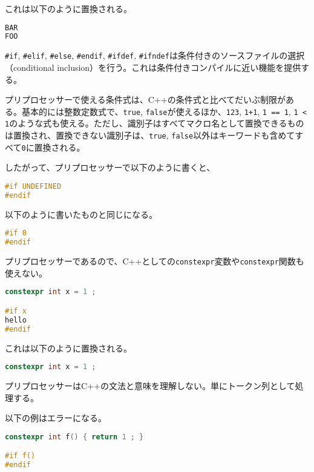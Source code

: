 これは以下のように置換される。

\begin{lstlisting}[language={C++}]
BAR
FOO
\end{lstlisting}


\texttt{\#if}, \texttt{\#elif}, \texttt{\#else}, \texttt{\#endif}, \texttt{\#ifdef}, \texttt{\#ifndef}は条件付きのソースファイルの選択（conditional inclusion）を行う。これは条件付きコンパイルに近い機能を提供する。


プリプロセッサーで使える条件式は、C++の条件式と比べてだいぶ制限がある。基本的には整数定数式で、\texttt{true}, \texttt{false}が使えるほか、\texttt{123}, \texttt{1+1}, \texttt{1 == 1}, \texttt{1 < 1}のような式も使える。ただし、識別子はすべてマクロ名として置換できるものは置換され、置換できない識別子は、\texttt{true}, \texttt{false}以外はキーワードも含めてすべて\texttt{0}に置換される。

したがって、プリプロセッサーで以下のように書くと、
\begin{lstlisting}[language={C++}]
#if UNDEFINED
#endif
\end{lstlisting}
以下のように書いたものと同じになる。
\begin{lstlisting}[language={C++}]
#if 0
#endif
\end{lstlisting}

プリプロセッサーであるので、C++としての\texttt{constexpr}変数や\texttt{constexpr}関数も使えない。

\begin{lstlisting}[language={C++}]
constexpr int x = 1 ;

#if x
hello
#endif
\end{lstlisting}

これは以下のように置換される。

\begin{lstlisting}[language={C++}]
constexpr int x = 1 ;
\end{lstlisting}

プリプロセッサーはC++の文法と意味を理解しない。単にトークン列として処理する。

以下の例はエラーになる。

\ifTombow\pagebreak\fi
\begin{lstlisting}[language={C++}]
constexpr int f() { return 1 ; }

#if f()
#endif
\end{lstlisting}

